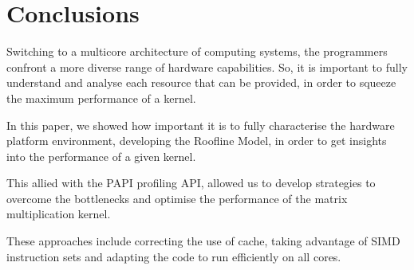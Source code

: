 \documentclass[twoside,twocolumn]{article}
\begin{document}
\begin{table}[h]
\caption{Execution times (in ms) of the same implementation in multiple platforms.}
\label{tab:final}
\end{table}

\section{Conclusions}

Switching to a multicore architecture of computing systems, the programmers confront a more diverse range of hardware capabilities. So, it is important to fully understand and analyse each resource that can be provided, in order to squeeze the maximum performance of a kernel.

In this paper, we showed how important it is to fully characterise the hardware platform environment, developing the Roofline Model, in order to get insights into the performance of a given kernel. 

This allied with the PAPI profiling API, allowed us to develop strategies to overcome the bottlenecks and optimise the performance of the matrix multiplication kernel.

These approaches include correcting the use of cache, taking advantage of SIMD instruction sets and adapting the code to run efficiently on all cores.

\end{document}
